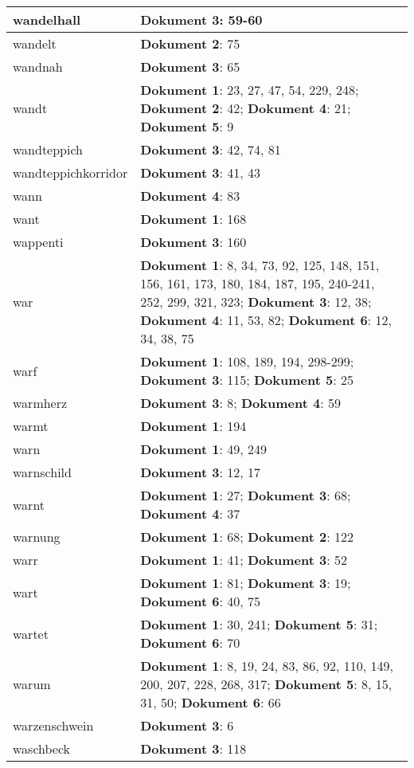 \documentclass[a5paper]{article}
\begin{document}
\begin{longtable}[l]{|l|p{3in}|}
\hline
wandelhall & \textbf{Dokument 3}: 59-60 \\
\hline
wandelt & \textbf{Dokument 2}: 75 \\
\hline
wandnah & \textbf{Dokument 3}: 65 \\
\hline
wandt & \textbf{Dokument 1}: 23, 27, 47, 54, 229, 248; \textbf{Dokument 2}: 42; \textbf{Dokument 4}: 21; \textbf{Dokument 5}: 9 \\
\hline
wandteppich & \textbf{Dokument 3}: 42, 74, 81 \\
\hline
wandteppichkorridor & \textbf{Dokument 3}: 41, 43 \\
\hline
wann & \textbf{Dokument 4}: 83 \\
\hline
want & \textbf{Dokument 1}: 168 \\
\hline
wappenti & \textbf{Dokument 3}: 160 \\
\hline
war & \textbf{Dokument 1}: 8, 34, 73, 92, 125, 148, 151, 156, 161, 173, 180, 184, 187, 195, 240-241, 252, 299, 321, 323; \textbf{Dokument 3}: 12, 38; \textbf{Dokument 4}: 11, 53, 82; \textbf{Dokument 6}: 12, 34, 38, 75 \\
\hline
warf & \textbf{Dokument 1}: 108, 189, 194, 298-299; \textbf{Dokument 3}: 115; \textbf{Dokument 5}: 25 \\
\hline
warmherz & \textbf{Dokument 3}: 8; \textbf{Dokument 4}: 59 \\
\hline
warmt & \textbf{Dokument 1}: 194 \\
\hline
warn & \textbf{Dokument 1}: 49, 249 \\
\hline
warnschild & \textbf{Dokument 3}: 12, 17 \\
\hline
warnt & \textbf{Dokument 1}: 27; \textbf{Dokument 3}: 68; \textbf{Dokument 4}: 37 \\
\hline
warnung & \textbf{Dokument 1}: 68; \textbf{Dokument 2}: 122 \\
\hline
warr & \textbf{Dokument 1}: 41; \textbf{Dokument 3}: 52 \\
\hline
wart & \textbf{Dokument 1}: 81; \textbf{Dokument 3}: 19; \textbf{Dokument 6}: 40, 75 \\
\hline
wartet & \textbf{Dokument 1}: 30, 241; \textbf{Dokument 5}: 31; \textbf{Dokument 6}: 70 \\
\hline
warum & \textbf{Dokument 1}: 8, 19, 24, 83, 86, 92, 110, 149, 200, 207, 228, 268, 317; \textbf{Dokument 5}: 8, 15, 31, 50; \textbf{Dokument 6}: 66 \\
\hline
warzenschwein & \textbf{Dokument 3}: 6 \\
\hline
waschbeck & \textbf{Dokument 3}: 118 \\

\end{longtable}
\end{document}
